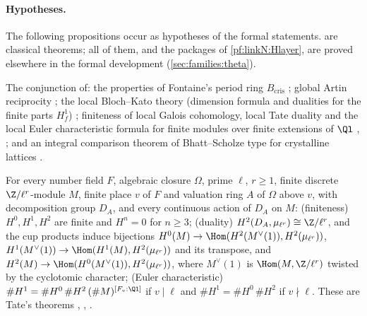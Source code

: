 \paragraph{Hypotheses.}
The following propositions occur as hypotheses of the formal statements. 
are classical theorems; all of them, and the packages of \cref{pf:linkN:Hlayer}, are proved elsewhere in the formal development
\cite{LeanSource2026} (\cref{sec:families:theta}).

\begin{hypothesis}\label{pf:linkN:H2}
The conjunction of: the properties of Fontaine's period ring $B_{\mathrm{cris}}$ \cite{Fontaine1982,Fontaine1994}; global
Artin reciprocity \cite{Artin1927,Neukirch1999}; the local Bloch--Kato theory (dimension formula and dualities for the
finite parts $H^1_f$) \cite[\S3]{BlochKato1990}; finiteness of local Galois cohomology, local Tate duality and the local
Euler characteristic formula for finite modules over finite extensions of $\Ql$ \cite{Tate1963},
\cite[Ch.~II, \S5]{Serre1997}; and an integral comparison theorem of Bhatt--Scholze type for crystalline lattices
\cite{BhattScholze2022,BhattScholze2023}.
\end{hypothesis}

\begin{hypothesis}\label{pf:linkN:Hdec}
For every number field $F$, algebraic closure $\Omega$, prime $\ell$, $r\ge1$, finite discrete $\Z/\ell^r$-module $M$,
finite place $v$ of $F$ and valuation ring $A$ of $\Omega$ above $v$, with decomposition group $D_A$, and every continuous
action of $D_A$ on $M$: (finiteness) $H^0,H^1,H^2$ are finite and $H^n=0$ for $n\ge3$; (duality)
$H^2(D_A,\mu_{\ell^r})\cong\Z/\ell^r$, and the cup products induce bijections
$H^0(M)\to\Hom(H^2(M^\vee(1)),H^2(\mu_{\ell^r}))$, $H^1(M^\vee(1))\to\Hom(H^1(M),H^2(\mu_{\ell^r}))$ and its transpose,
and $H^2(M)\to\Hom(H^0(M^\vee(1)),H^2(\mu_{\ell^r}))$, where $M^\vee(1)$ is $\Hom(M,\Z/\ell^r)$ twisted by the cyclotomic
character; (Euler characteristic) $\#H^1=\#H^0\,\#H^2\,(\#M)^{[F_v:\Ql]}$ if $v\mid\ell$ and $\#H^1=\#H^0\,\#H^2$ if
$v\nmid\ell$. These are Tate's theorems \cite{Tate1963}, \cite[Ch.~II, \S5]{Serre1997},
\cite[Ch.~VII]{NeukirchSchmidtWingberg2008}.
\end{hypothesis}

